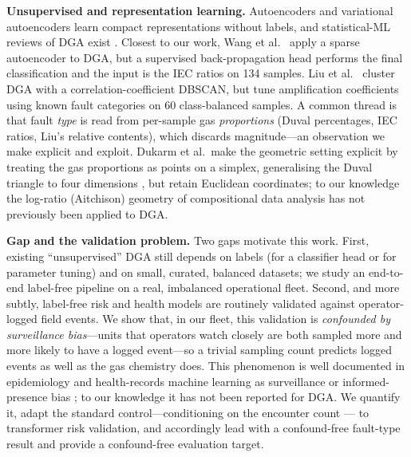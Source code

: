 \textbf{Unsupervised and representation learning.}
Autoencoders \cite{hinton2006reducing} and variational autoencoders \cite{kingma2014vae}
learn compact representations without labels, and statistical-ML reviews of DGA exist
\cite{mirowski2012review}. Closest to our work, Wang et al.\ \cite{wang2016csae} apply a
sparse autoencoder to DGA, but a supervised back-propagation head performs the final
classification and the input is the IEC ratios on 134 samples. Liu et al.\
\cite{dga_dbscan2020} cluster DGA with a correlation-coefficient DBSCAN, but tune
amplification coefficients using known fault categories on 60 class-balanced samples.
A common thread is that fault \emph{type} is read from per-sample gas \emph{proportions} (Duval
percentages, IEC ratios, Liu's relative contents), which discards magnitude---an observation
we make explicit and exploit. Dukarm et al.\ make the geometric setting explicit by treating
the gas proportions as points on a simplex, generalising the Duval triangle to four dimensions
\cite{dukarm2020simplex}, but retain Euclidean coordinates; to our knowledge the log-ratio
(Aitchison) geometry of compositional data analysis \cite{aitchison1982coda} has not previously
been applied to DGA.

\textbf{Gap and the validation problem.}
Two gaps motivate this work. First, existing ``unsupervised'' DGA still depends on labels (for
a classifier head or for parameter tuning) and on small, curated, balanced datasets; we study
an end-to-end label-free pipeline on a real, imbalanced operational fleet. Second, and more
subtly, label-free risk and health models are routinely validated against operator-logged
field events. We show that, in our fleet, this validation is \emph{confounded by surveillance bias}---units
that operators watch closely are both sampled more and more likely to have a logged event---so
a trivial sampling count predicts logged events as well as the gas chemistry does. This
phenomenon is well documented in epidemiology and health-records machine learning as
surveillance or informed-presence bias \cite{sackett1979bias,haut2011surveillance,%
goldstein2016informed}; to our knowledge it has not been reported for DGA. We quantify it,
adapt the standard control---conditioning on the encounter count \cite{goldstein2016informed}---%
to transformer risk validation, and accordingly lead with a confound-free fault-type result and
provide a confound-free evaluation target.
